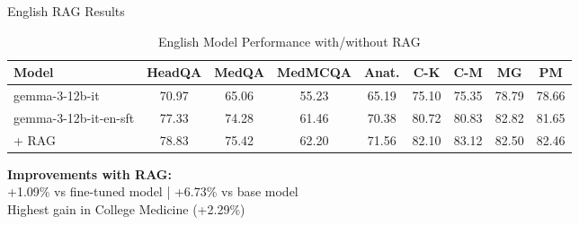 \begin{frame}{English RAG Results}
    \begin{table}[h]
        \centering
        \tiny
        \caption{English Model Performance with/without RAG}
        \begin{tabular}{l|cccccccc}
            \toprule
            \textbf{Model} & \textbf{HeadQA} & \textbf{MedQA} & \textbf{MedMCQA} & \textbf{Anat.} & \textbf{C-K} & \textbf{C-M} & \textbf{MG} & \textbf{PM} \\
            \midrule
            gemma-3-12b-it & 70.97 & 65.06 & 55.23 & 65.19 & 75.10 & 75.35 & 78.79 & 78.66 \\
            gemma-3-12b-it-en-sft & 77.33 & 74.28 & 61.46 & 70.38 & 80.72 & 80.83 & 82.82 & 81.65 \\
            \rowcolor{improvement!20} + RAG & 78.83 & 75.42 & 62.20 & 71.56 & 82.10 & 83.12 & 82.50 & 82.46 \\
            \bottomrule
        \end{tabular}
    \end{table}
    
    \vspace{0.5em}
    
    \begin{center}
        \textbf{Improvements with RAG:}\\
        +1.09\% vs fine-tuned model | +6.73\% vs base model\\
        Highest gain in College Medicine (+2.29\%)
    \end{center}
\end{frame}

